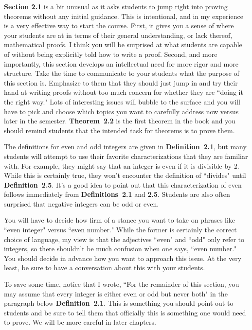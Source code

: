 \documentclass[11pt]{article}%
\newcommand{\blankline}{\pagebreak[2]\vspace{.5\baselineskip}}
\begin{document}
\blankline

\textbf{Section 2.1} is a bit unusual as it asks students to jump right into proving theorems without any initial guidance.  This is intentional, and in my experience is a very effective way to start the course.  First, it gives you a sense of where your students are at in terms of their general understanding, or lack thereof, mathematical proofs.  I think you will be surprised at what students are capable of without being explicitly told how to write a proof.  Second, and more importantly, this section develops an intellectual need for more rigor and more structure.  Take the time to communicate to your students what the purpose of this section is.  Emphasize to them that they should just jump in and try their hand at writing proofs without too much concern for whether they are ``doing it the right way." Lots of interesting issues will bubble to the surface and you will have to pick and choose which topics you want to carefully address now versus later in the semester.  \textbf{Theorem~2.2} is the first theorem in the book and you should remind students that the intended task for theorems is to prove them.

\blankline

The definitions for even and odd integers are given in \textbf{Definition~2.1}, but many students will attempt to use their favorite characterizations  that they are familiar with.  For example, they might say that an integer is even if it is divisible by 2.  While this is certainly true, they won't encounter the definition of ``divides" until \textbf{Definition~2.5}. It's a good idea to point out that this characterization of even follows immediately from \textbf{Definitions~2.1} and \textbf{2.5}. Students are also often surprised that negative integers can be odd or even.  

\blankline

You will have to decide how firm of a stance you want to take on phrases like ``even integer" versus ``even number."  While the former is certainly the correct choice of language, my view is that the adjectives ``even" and ``odd" only refer to integers, so there shouldn't be much confusion when one says, ``even number."  You should decide in advance how you want to approach this issue.  At the very least, be sure to have a conversation about this with your students.  

\blankline

To save some time, notice that I wrote, ``For the remainder of this section, you may assume that every integer is either even or odd but never both" in the paragraph below \textbf{Definition~2.1}.  This is something you should point out to students and be sure to tell them that officially this is something one would need to prove. We will be more careful in later chapters.
\end{document}
